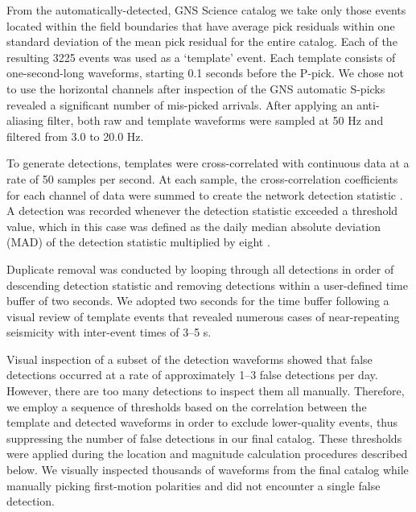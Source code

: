 From the automatically-detected, GNS Science catalog we take only those events located within the field boundaries that have average pick residuals within one standard deviation of the mean pick residual for the entire catalog. Each of the resulting 3225 events was used as a `template' event. Each template consists of one-second-long waveforms, starting 0.1 seconds before the P-pick. We chose not to use the horizontal channels after inspection of the GNS automatic S-picks revealed a significant number of mis-picked arrivals. After applying an anti-aliasing filter, both raw and template waveforms were sampled at 50 Hz and filtered from 3.0 to 20.0 Hz.

To generate detections, templates were cross-correlated with continuous
data at a rate of 50 samples per second. At each sample, the cross-correlation
coefficients for each channel of data were summed to create the network detection statistic \citep{Shelly_2007}. A detection was recorded whenever the detection statistic exceeded a threshold value, which in this case was defined as the daily median absolute deviation (MAD) of the detection statistic multiplied by eight \citep[as suggested by][]{Shelly_2007}.

Duplicate removal was conducted by looping through all detections in order of descending detection statistic and removing detections within a user-defined time buffer of two seconds. We adopted two seconds for the time buffer following a visual review of template events that revealed numerous cases of near-repeating seismicity with inter-event times of 3--5 s.

Visual inspection of a subset of the detection waveforms showed that false detections occurred at a rate of approximately 1--3 false detections per day. However, there are too many detections to inspect them all manually. Therefore, we employ a sequence of thresholds based on the correlation between the template and detected waveforms in order to exclude lower-quality events, thus suppressing the number of false detections in our final catalog. These thresholds were applied during the location and magnitude calculation procedures described below. We visually inspected thousands of waveforms from the final catalog while manually picking first-motion polarities and did not encounter a single false detection.

